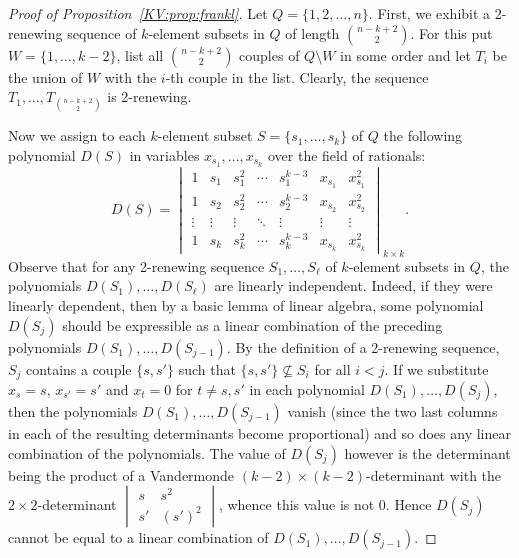 \documentclass{irmaart}
\theoremstyle{plain}
\begin{document}
\begin{proof}[Proof of Proposition~\ref{KV:prop:frankl}] Let $Q=\{1,2,\dots,n\}$.
First, we exhibit a 2-renewing sequence of $k$-element subsets in $Q$ of length
$\binom{n-k+2}2$. For this put $W=\{1,\dots,k-2\}$, list all $\binom{n-k+2}2$
couples of $Q\setminus W$ in some order and let $T_i$ be the union of $W$ with
the $i$-th couple in the list. Clearly, the sequence
$T_1,\dots,T_{\binom{n-k+2}2}$ is 2-renewing.

Now we assign to each $k$-element subset $S=\{s_1,\dots,s_k\}$ of $Q$ the
following polynomial $D(S)$ in variables $x_{s_1},\dots,x_{s_k}$ over the field
of rationals:
\begin{displaymath}
D(S)=\begin{vmatrix}
1 & s_1 & s_1^2 & \cdots & s_1^{k-3} & x_{s_1} & x_{s_1}^2\\
1 & s_2 & s_2^2 & \cdots & s_2^{k-3} & x_{s_2} & x_{s_2}^2\\
\vdots & \vdots & \vdots & \ddots & \vdots & \vdots & \vdots\\
1 & s_k & s_k^2 & \cdots & s_k^{k-3} & x_{s_k} & x_{s_k}^2
\end{vmatrix}_{k\times k}.
\end{displaymath}
Observe that for any 2-renewing sequence $S_1,\dots,S_\ell$ of $k$-element
subsets in $Q$, the polynomials $D(S_1),\dots,D(S_\ell)$ are linearly
independent. Indeed, if they were linearly dependent, then by a basic lemma of
linear algebra, some polynomial $D(S_j)$ should be expressible as a linear
combination of the preceding polynomials $D(S_1),\dots,D(S_{j-1})$. By the
definition of a 2-renewing sequence, $S_j$ contains a couple $\{s,s'\}$ such
that $\{s,s'\}\nsubseteq S_i$ for all $i<j$. If we substitute $x_s=s$,
$x_{s'}=s'$ and $x_t=0$ for $t\ne s,s'$ in each polynomial
$D(S_1),\dots,D(S_j)$, then the polynomials $D(S_1),\dots,D(S_{j-1})$ vanish
(since the two last columns in each of the resulting determinants become
proportional) and so does any linear combination of the polynomials. The value
of $D(S_j)$ however is the determinant being the product of a Vandermonde
$(k-2)\times(k-2)$-determinant with the $2\times 2$-determinant $\begin{vmatrix} s & s^2\\
s' & (s')^2\end{vmatrix}$, whence this value is not 0. Hence $D(S_j)$ cannot be
equal to a linear combination of $D(S_1),\dots,D(S_{j-1})$.


\end{proof}
\end{document}
